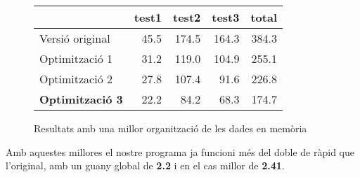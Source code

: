\begin{figure}[ht]
  \caption{Resultats amb una millor organització de les dades en memòria}\label{fig:elapsed_3}
  \begin{center}
    \begin{tabular}{ l r r r r }
      & test1 & test2 & test3 & total \\
      \hline
      Versió original & 45.5 & 174.5 & 164.3 & 384.3 \\
      Optimització 1 & 31.2 & 119.0 & 104.9 & 255.1 \\
      Optimització 2 & 27.8 & 107.4 & 91.6 & 226.8 \\
      \textbf{Optimització 3} & 22.2 & 84.2 & 68.3 & 174.7 \\
    \end{tabular}
  \end{center}
\end{figure}

Amb aquestes millores el nostre programa ja funcioni més del doble de ràpid que l'original, amb un guany global de \textbf{2.2} i en el cas millor de \textbf{2.41}.
